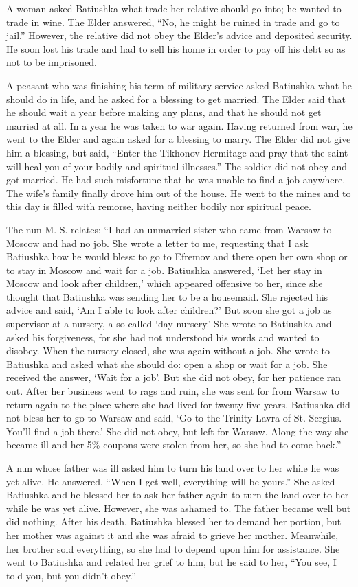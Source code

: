 A woman asked Batiushka what trade her relative should go into; he wanted to trade in wine. The Elder answered, ``No, he might be ruined in trade and go to jail.'' However, the relative did not obey the Elder's advice and deposited security. He soon lost his trade and had to sell his home in order to pay off his debt so as not to be imprisoned.

A peasant who was finishing his term of military service asked Batiushka what he should do in life, and he asked for a blessing to get married. The Elder said that he should wait a year before making any plans, and that he should not get married at all. In a year he was taken to war again. Having returned from war, he went to the Elder and again asked for a blessing to marry. The Elder did not give him a blessing, but said, ``Enter the Tikhonov Hermitage and pray that the saint will heal you of your bodily and spiritual illnesses.'' The soldier did not obey and got married. He had such misfortune that he was unable to find a job anywhere. The wife's family finally drove him out of the house. He went to the mines and to this day is filled with remorse, having neither bodily nor spiritual peace.

The nun M. S. relates: ``I had an unmarried sister who came from Warsaw to Moscow and had no job. She wrote a letter to me, requesting that I ask Batiushka how he would bless: to go to Efremov and there open her own shop or to stay in Moscow and wait for a job. Batiushka answered, `Let her stay in Moscow and look after children,' which appeared offensive to her, since she thought that Batiushka was sending her to be a housemaid. She rejected his advice and said, `Am I able to look after children?' But soon she got a job as supervisor at a nursery, a so-called `day nursery.' She wrote to Batiushka and asked his forgiveness, for she had not understood his words and wanted to disobey. When the nursery closed, she was again without a job. She wrote to Batiushka and asked what she should do: open a shop or wait for a job. She received the answer, `Wait for a job'. But she did not obey, for her patience ran out. After her business went to rags and ruin, she was sent for from Warsaw to return again to the place where she had lived for twenty-five years. Batiushka did not bless her to go to Warsaw and said, `Go to the Trinity Lavra of St. Sergius. You'll find a job there.' She did not obey, but left for Warsaw. Along the way she became ill and her 5\% coupons were stolen from her, so she had to come back.''

A nun whose father was ill asked him to turn his land over to her while he was yet alive. He answered, ``When I get well, everything will be yours.'' She asked Batiushka and he blessed her to ask her father again to turn the land over to her while he was yet alive. However, she was ashamed to. The father became well but did nothing. After his death, Batiushka blessed her to demand her portion, but her mother was against it and she was afraid to grieve her mother. Meanwhile, her brother sold everything, so she had to depend upon him for assistance. She went to Batiushka and related her grief to him, but he said to her, ``You see, I told you, but you didn't obey.''


